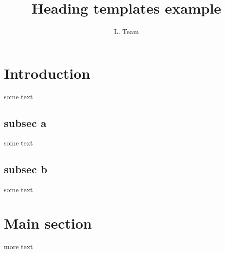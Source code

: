 \documentclass{article}
\title{Heading templates example}
\author{L. Team}
\begin{document}
\maketitle
\section{Introduction}
some text

\subsection{subsec a}
some text
\subsection{subsec b}
some text

\section{Main section}
more text
\end{document}
